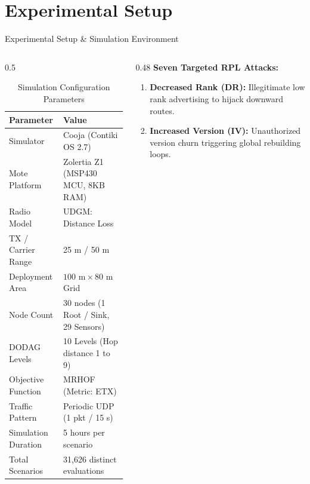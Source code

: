 \documentclass[aspectratio=169, 10pt]{beamer}
\begin{document}
\section{Experimental Setup}
\begin{frame}{Experimental Setup \& Simulation Environment}
  \begin{columns}[T]
    \begin{column}{0.5\textwidth}
      \begin{table}[h]
        \centering
        \scriptsize
        \caption{Simulation Configuration Parameters \cite{yilmaz2025exploring}}
        \begin{tabular}{ll}
          \toprule
          \textbf{Parameter} & \textbf{Value} \\
          \midrule
          Simulator & Cooja (Contiki OS 2.7) \\
          Mote Platform & Zolertia Z1 (MSP430 MCU, 8KB RAM) \\
          Radio Model & UDGM: Distance Loss \\
          TX / Carrier Range & 25 m / 50 m \\
          Deployment Area & $100\text{ m} \times 80\text{ m}$ Grid \\
          Node Count & 30 nodes (1 Root / Sink, 29 Sensors) \\
          DODAG Levels & 10 Levels (Hop distance 1 to 9) \\
          Objective Function & MRHOF (Metric: ETX) \\
          Traffic Pattern & Periodic UDP (1 pkt / 15 s) \\
          Simulation Duration & 5 hours per scenario \\
          Total Scenarios & 31,626 distinct evaluations \\
          \bottomrule
        \end{tabular}
      \end{table}
    \end{column}
    \begin{column}{0.48\textwidth}
      \textbf{Seven Targeted RPL Attacks:}
      \begin{enumerate}\scriptsize
        \item \textbf{Decreased Rank (DR):} Illegitimate low rank advertising to hijack downward routes.
        \item \textbf{Increased Version (IV):} Unauthorized version churn triggering global rebuilding loops.

\end{enumerate}
\end{column}
\end{columns}
\end{frame}
\end{document}

